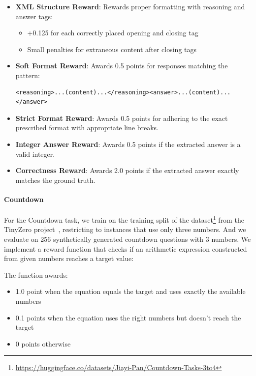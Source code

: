 \begin{itemize}
    \item \textbf{XML Structure Reward}: Rewards proper formatting with reasoning and answer tags:
    \begin{itemize}
        \item +0.125 for each correctly placed opening and closing tag
        \item Small penalties for extraneous content after closing tags
    \end{itemize}
    
    \item \textbf{Soft Format Reward}: Awards 0.5 points for responses matching the pattern:
    \begin{verbatim}<reasoning>...(content)...</reasoning><answer>...(content)...</answer>\end{verbatim}
    
    \item \textbf{Strict Format Reward}: Awards 0.5 points for adhering to the exact prescribed format with appropriate line breaks.
    
    \item \textbf{Integer Answer Reward}: Awards 0.5 points if the extracted answer is a valid integer.
    
    \item \textbf{Correctness Reward}: Awards 2.0 points if the extracted answer exactly matches the ground truth.
\end{itemize}


\paragraph{Countdown}

For the Countdown task, we train on the training split of the
dataset\footnote{\url{https://huggingface.co/datasets/Jiayi-Pan/Countdown-Tasks-3to4}} 
from the TinyZero project~\citep{tinyzero}, restricting to
instances that use only three numbers. And we evaluate on 256 synthetically generated countdown questions with 3 numbers. We implement a reward function that checks if an arithmetic expression constructed from given numbers reaches a target value:

The function awards:
\begin{itemize}
    \item 1.0 point when the equation equals the target and uses exactly the available numbers
    \item 0.1 points when the equation uses the right numbers but doesn't reach the target
    \item 0 points otherwise
\end{itemize}
